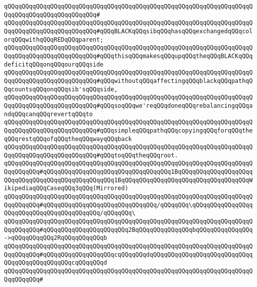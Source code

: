 \verb|qQQqqQQqqQQqqQQqqQQqqQQqqQQqqQQqqQQqqQQqqQQqqQQqqQQqqQQqqQQqqQQqqQQqqQQqqQQqqQQqqQQqqQQqqQQqqQQq#|\newline
\verb|qQQqqQQqqQQqqQQqqQQqqQQqqQQqqQQqqQQqqQQqqQQqqQQqqQQqqQQqqQQqqQQqqQQqqQQqqQQqqQQqqQQqqQQqqQQqqQQq#qQQqBLACKqQQqsibqQQqhasqQQqexchangedqQQqcolorqQQqwithqQQqREDqQQqparent;|\newline
\verb|qQQqqQQqqQQqqQQqqQQqqQQqqQQqqQQqqQQqqQQqqQQqqQQqqQQqqQQqqQQqqQQqqQQqqQQqqQQqqQQqqQQqqQQqqQQqqQQq#qQQqthisqQQqmakesqQQqupqQQqtheqQQqBLACKqQQqdeficitqQQqonqQQqourqQQqside|\newline
\verb|qQQqqQQqqQQqqQQqqQQqqQQqqQQqqQQqqQQqqQQqqQQqqQQqqQQqqQQqqQQqqQQqqQQqqQQqqQQqqQQqqQQqqQQqqQQqqQQq#qQQqwithoutqQQqaffectingqQQqblackqQQqpathqQQqcountsqQQqonqQQqsib'sqQQqside,|\newline
\verb|qQQqqQQqqQQqqQQqqQQqqQQqqQQqqQQqqQQqqQQqqQQqqQQqqQQqqQQqqQQqqQQqqQQqqQQqqQQqqQQqqQQqqQQqqQQqqQQq#qQQqsoqQQqwe'reqQQqdoneqQQqrebalancingqQQqandqQQqcanqQQqrevertqQQqto|\newline
\verb|qQQqqQQqqQQqqQQqqQQqqQQqqQQqqQQqqQQqqQQqqQQqqQQqqQQqqQQqqQQqqQQqqQQqqQQqqQQqqQQqqQQqqQQqqQQqqQQq#qQQqsimpleqQQqpathqQQqcopyingqQQqforqQQqtheqQQqrestqQQqofqQQqtheqQQqwayqQQqback|\newline
\verb|qQQqqQQqqQQqqQQqqQQqqQQqqQQqqQQqqQQqqQQqqQQqqQQqqQQqqQQqqQQqqQQqqQQqqQQqqQQqqQQqqQQqqQQqqQQqqQQq#qQQqtoqQQqtheqQQqroot.|\newline
\newline
\verb|qQQqqQQqqQQqqQQqqQQqqQQqqQQqqQQqqQQqqQQqqQQqqQQqqQQqqQQqqQQqqQQqqQQqqQQqqQQqqQQq#qQQqqQQqqQQqqQQqqQQqqQQqqQQqqQQqqQQq1BqQQqqQQqqQQqqQQqqQQqqQQqqQQqqQQqqQQqqQQqqQQqqQQqqQQq1BqQQqqQQqqQQqqQQqqQQqqQQqqQQqqQQqqQQqWikipediaqQQqCaseqQQq3qQQq(Mirrored)|\newline
\verb|qQQqqQQqqQQqqQQqqQQqqQQqqQQqqQQqqQQqqQQqqQQqqQQqqQQqqQQqqQQqqQQqqQQqqQQqqQQqqQQq#qQQqqQQqqQQqqQQqqQQqqQQqqQQqqQQq/qQQqqQQq\qQQqqQQqqQQqqQQqqQQqqQQqqQQqqQQqqQQqqQQqqQQq/qQQqqQQq\|\newline
\verb|qQQqqQQqqQQqqQQqqQQqqQQqqQQqqQQqqQQqqQQqqQQqqQQqqQQqqQQqqQQqqQQqqQQqqQQqqQQqqQQq#qQQqqQQqqQQqqQQqqQQqqQQq2BqQQqqQQqqQQqqQQqbqQQqqQQqqQQqqQQq->qQQqqQQqqQQq2RqQQqqQQqqQQqb|\newline
\verb|qQQqqQQqqQQqqQQqqQQqqQQqqQQqqQQqqQQqqQQqqQQqqQQqqQQqqQQqqQQqqQQqqQQqqQQqqQQqqQQq#qQQqqQQqqQQqqQQqqQQqcqQQqqQQqdqQQqqQQqqQQqqQQqqQQqqQQqqQQqqQQqqQQqqQQqqQQqqQQqcqQQqqQQqd|\newline
\verb|qQQqqQQqqQQqqQQqqQQqqQQqqQQqqQQqqQQqqQQqqQQqqQQqqQQqqQQqqQQqqQQqqQQqqQQqqQQqqQQq#|\newline
